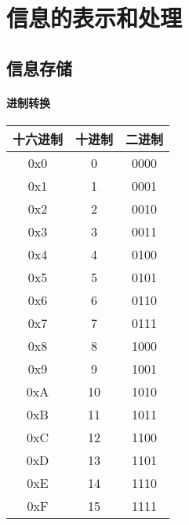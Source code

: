 \section{信息的表示和处理}

\subsection{信息存储}

\paragraph{进制转换}
\begin{table}[htbp]
    \centering
    \begin{tabular}{|c|c|c|}
        \hline
        十六进制 & 十进制 & 二进制  \\
        \hline
        0x0  & 0   & 0000 \\
        \hline
        0x1  & 1   & 0001 \\
        \hline
        0x2  & 2   & 0010 \\
        \hline
        0x3  & 3   & 0011 \\
        \hline
        0x4  & 4   & 0100 \\
        \hline
        0x5  & 5   & 0101 \\
        \hline
        0x6  & 6   & 0110 \\
        \hline
        0x7  & 7   & 0111 \\
        \hline
        0x8  & 8   & 1000 \\
        \hline
        0x9  & 9   & 1001 \\
        \hline
        0xA  & 10  & 1010 \\
        \hline
        0xB  & 11  & 1011 \\
        \hline
        0xC  & 12  & 1100 \\
        \hline
        0xD  & 13  & 1101 \\
        \hline
        0xE  & 14  & 1110 \\
        \hline
        0xF  & 15  & 1111 \\
        \hline
    \end{tabular}
\end{table}


